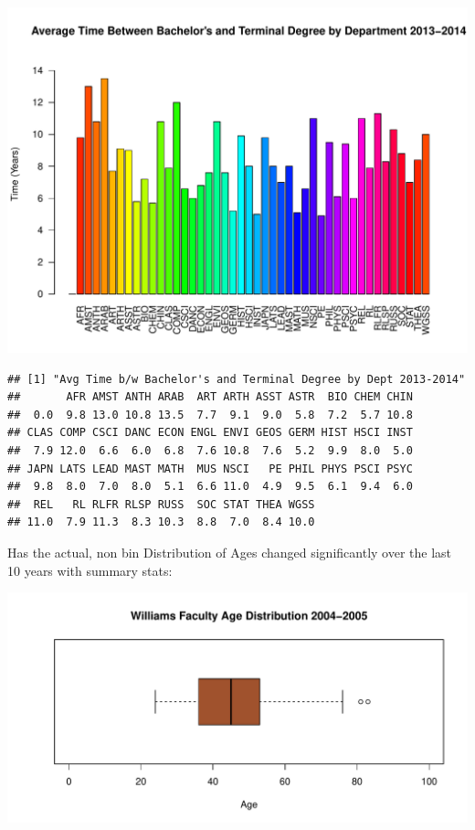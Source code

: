 \documentclass[12pt,a4paper]{article}\usepackage[]{graphicx}\usepackage[]{color}
\makeatletter
\def\maxwidth{ %
  \ifdim\Gin@nat@width>\linewidth
    \linewidth
  \else
    \Gin@nat@width
  \fi
}
\newenvironment{kframe}{%
 \def\at@end@of@kframe{}%
 \ifinner\ifhmode%
  \def\at@end@of@kframe{\end{minipage}}%
  \begin{minipage}{\columnwidth}%
 \fi\fi%
 \def\FrameCommand##1{\hskip\@totalleftmargin \hskip-\fboxsep
 \colorbox{shadecolor}{##1}\hskip-\fboxsep
     \hskip-\linewidth \hskip-\@totalleftmargin \hskip\columnwidth}%
 \MakeFramed {\advance\hsize-\width
   \@totalleftmargin\z@ \linewidth\hsize
   \@setminipage}}%
 {\par\unskip\endMakeFramed%
 \at@end@of@kframe}
\newenvironment{knitrout}{}{} %
\theoremstyle{definition}
\makeatother
\begin{document}
\begin{knitrout}
\includegraphics[width=\maxwidth]{figure/unnamed-chunk-13-10} 
\begin{kframe}\begin{verbatim}
## [1] "Avg Time b/w Bachelor's and Terminal Degree by Dept 2013-2014"
##       AFR AMST ANTH ARAB  ART ARTH ASST ASTR  BIO CHEM CHIN 
##  0.0  9.8 13.0 10.8 13.5  7.7  9.1  9.0  5.8  7.2  5.7 10.8 
## CLAS COMP CSCI DANC ECON ENGL ENVI GEOS GERM HIST HSCI INST 
##  7.9 12.0  6.6  6.0  6.8  7.6 10.8  7.6  5.2  9.9  8.0  5.0 
## JAPN LATS LEAD MAST MATH  MUS NSCI   PE PHIL PHYS PSCI PSYC 
##  9.8  8.0  7.0  8.0  5.1  6.6 11.0  4.9  9.5  6.1  9.4  6.0 
##  REL   RL RLFR RLSP RUSS  SOC STAT THEA WGSS 
## 11.0  7.9 11.3  8.3 10.3  8.8  7.0  8.4 10.0
\end{verbatim}
\end{kframe}
\end{knitrout}

\bigskip
Has the actual, non bin Distribution of Ages changed significantly over the last 10 years with summary stats:

\begin{knitrout}
\color{fgcolor}
\includegraphics[width=\maxwidth]{figure/unnamed-chunk-14-1} 

\end{knitrout}
\end{document}
